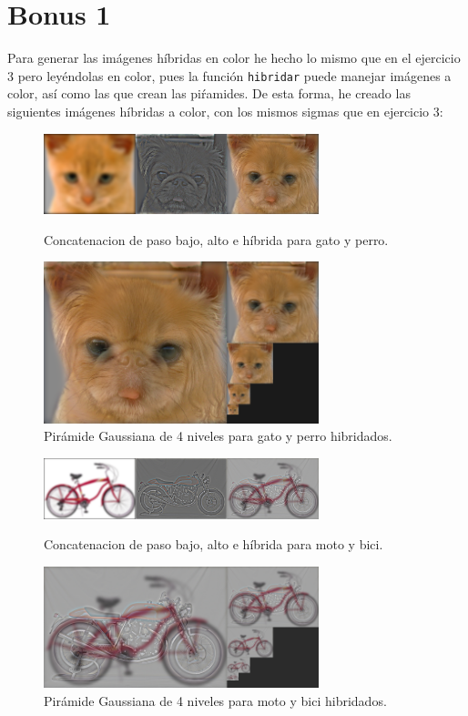 \documentclass[12pt]{article}
\begin{document}
\section*{Bonus 1}

Para generar las imágenes híbridas en color he hecho lo mismo que en el ejercicio 3 pero leyéndolas en color, pues la función \texttt{hibridar} puede manejar imágenes a color, así como las que crean las piŕamides. De esta forma, he creado las siguientes imágenes híbridas a color, con los mismos sigmas que en ejercicio 3:\\

\begin{figure}[H]
\centering
\parbox{8cm}{
\includegraphics[width=8cm]{images/ImagenGPCol.png}
\caption{Concatenacion de paso bajo, alto e híbrida para gato y perro.}
\label{fig:2figsA}}
\begin{minipage}{8cm}
\includegraphics[width=8cm]{images/PirGPCol.png}
\caption{Pirámide Gaussiana de 4 niveles para gato y perro hibridados.}
\label{fig:2figsB}
\end{minipage}
\end{figure}

\begin{figure}[H]
\centering
\parbox{8cm}{
\includegraphics[width=8cm]{images/ImagenMBCol.png}
\caption{Concatenacion de paso bajo, alto e híbrida para moto y bici.}
\label{fig:2figsA}}
\begin{minipage}{8cm}
\includegraphics[width=8cm]{images/PirMBCol.png}
\caption{Pirámide Gaussiana de 4 niveles para moto y bici hibridados.}
\label{fig:2figsB}
\end{minipage}
\end{figure}
\end{document}
